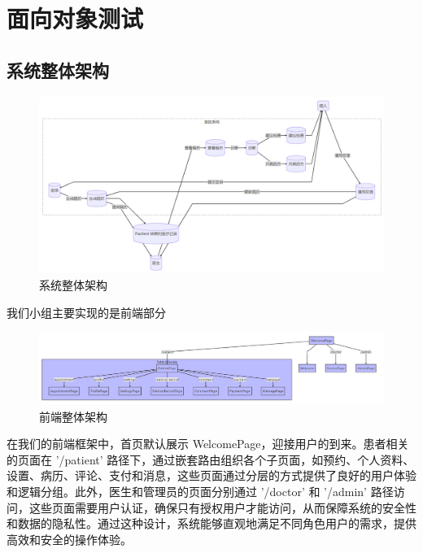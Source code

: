 \section{面向对象测试}
\subsection{系统整体架构}
\begin{figure}[htbp]
	\centering
	\includegraphics[width=\textwidth]{figures/sys.png}
	\caption{系统整体架构}
\end{figure}
我们小组主要实现的是前端部分
\begin{figure}[htbp]
	\centering
	\includegraphics[width=\textwidth]{figures/front.png}
	\caption{前端整体架构}
\end{figure}
在我们的前端框架中，首页默认展示 WelcomePage，迎接用户的到来。患者相关的页面在 '/patient' 路径下，通过嵌套路由组织各个子页面，如预约、个人资料、设置、病历、评论、支付和消息，这些页面通过分层的方式提供了良好的用户体验和逻辑分组。此外，医生和管理员的页面分别通过 '/doctor' 和 '/admin' 路径访问，这些页面需要用户认证，确保只有授权用户才能访问，从而保障系统的安全性和数据的隐私性。通过这种设计，系统能够直观地满足不同角色用户的需求，提供高效和安全的操作体验。